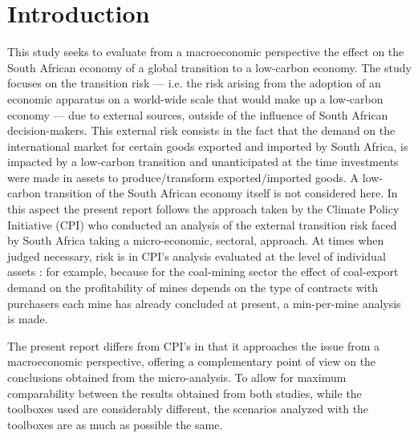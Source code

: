 \documentclass[12pt,english]{article}
\begin{document}

\tableofcontents

\section{Introduction}



This study seeks to evaluate from a macroeconomic perspective the effect on the South African economy of a global transition to a low-carbon economy. The study focuses on the transition risk --- i.e. the risk arising from the adoption of an economic apparatus on a world-wide scale that would make up a low-carbon economy --- due to external sources, outside of the influence of South African decision-makers. This external risk consists in the fact that the demand on the international market for certain goods exported and imported by South Africa, %
is impacted by a low-carbon transition and unanticipated at the time investments were made in assets to produce/transform exported/imported goods. 
A low-carbon transition of the South African economy itself is not considered here. In this aspect the present report follows the approach taken by the Climate Policy Initiative (CPI) who conducted an analysis of the external transition risk faced by South Africa taking a micro-economic, sectoral, approach. At times when judged necessary, risk is in CPI's analysis evaluated at the level of individual assets : for example, because for the coal-mining sector the effect of coal-export demand on the profitability of mines depends on the type of contracts with purchasers each mine has already concluded at present, a min-per-mine analysis is made. 

The present report differs from CPI's in that it approaches the issue from a macroeconomic perspective, %
offering a complementary point of view on the conclusions obtained from the micro-analysis. To allow for maximum comparability between the results obtained from both studies, while the toolboxes used are considerably different, the scenarios analyzed with the toolboxes are as much as possible the same. 
\end{document}
